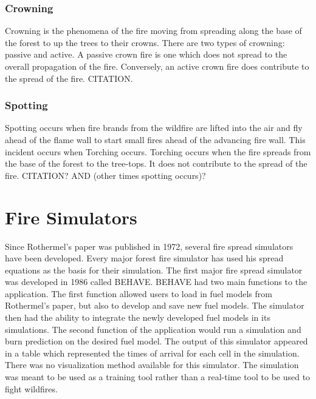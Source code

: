 \subsubsection{Crowning}
Crowning is the phenomena of the fire moving from spreading along the base of the forest to up the trees to their crowns. There are two types of crowning: passive and active. A passive crown fire is one which does not spread to the overall propagation of the fire. Conversely, an active crown fire does contribute to the spread of the fire. CITATION.

\subsubsection{Spotting}
Spotting occurs when fire brands from the wildfire are lifted into the air and fly ahead of the flame wall to start small fires ahead of the advancing fire wall. This incident occurs when Torching occurs. Torching occurs when the fire spreads from the base of the forest to the tree-tops. It does not contribute to the spread of the fire. CITATION? AND (other times spotting occurs)? 

\section{Fire Simulators}
Since Rothermel's paper was published in 1972, several fire spread simulators have been developed. Every major forest fire simulator has used his spread equations as the basis for their simulation. The first major fire spread simulator was developed in 1986 called BEHAVE\cite{BEHAVE}. BEHAVE had two main functions to the application. The first function allowed users to load in fuel models from Rothermel's paper, but also to develop and save new fuel models. The simulator then had the ability to integrate the newly developed fuel models in its simulations. The second function of the application would run a simulation and burn prediction on the desired fuel model. The output of this simulator appeared in a table which represented the times of arrival for each cell in the simulation. There was no visualization method available for this simulator. The simulation was meant to be used as a training tool rather than a real-time tool to be used to fight wildfires. 

